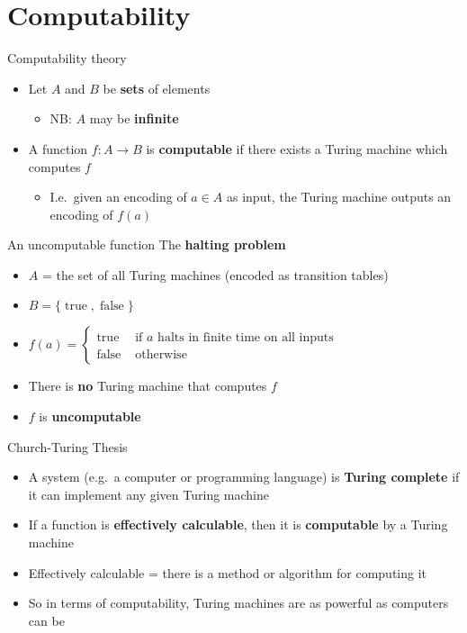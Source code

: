 \part{Computability}
\frame{\partpage}

\begin{frame}{Computability theory}
	\begin{itemize}
		\pause\item Let $A$ and $B$ be \textbf{sets} of elements
			\begin{itemize}
				\pause\item NB: $A$ may be \textbf{infinite}
			\end{itemize}
		\pause\item A function $f : A \to B$ is \textbf{computable} if there exists a Turing machine
			which computes $f$
			\begin{itemize}
				\pause\item I.e.\ given an encoding of $a \in A$ as input, the Turing machine outputs an encoding of
					$f(a)$
			\end{itemize}
	\end{itemize}
\end{frame}

\begin{frame}{An uncomputable function}
	The \textbf{halting problem}
	\begin{itemize}
		\pause\item $A$ = the set of all Turing machines (encoded as transition tables)
		\pause\item $B = \{ \operatorname{true}, \operatorname{false} \}$
		\pause\item $f(a) = \begin{cases}
			\operatorname{true} & \text{ if $a$ halts in finite time on all inputs} \\
			\operatorname{false} & \text{ otherwise}
		\end{cases}$
		\pause\item There is \textbf{no} Turing machine that computes $f$
		\pause\item $f$ is \textbf{uncomputable}
	\end{itemize}
\end{frame}

\begin{frame}{Church-Turing Thesis}
	\begin{itemize}
		\pause\item A system (e.g.\ a computer or programming language) is \textbf{Turing complete}
			if it can implement any given Turing machine
		\pause\item If a function is \textbf{effectively calculable}, then it is \textbf{computable} by a Turing machine
		\pause\item Effectively calculable = there is a method or algorithm for computing it
		\pause\item So in terms of computability, Turing machines are as powerful as computers can be
	\end{itemize}
\end{frame}

